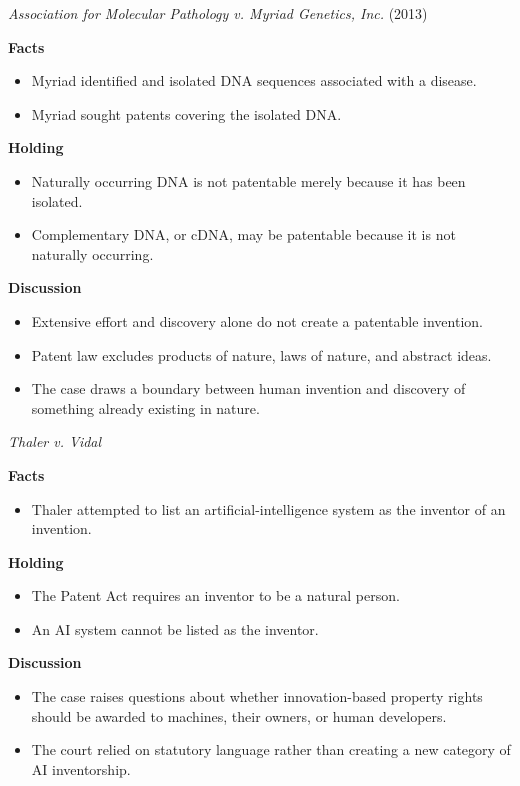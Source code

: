 \documentclass[11pt]{tex/lawoutline}
\begin{document}
\casebox
{\textit{Association for Molecular Pathology v. Myriad Genetics, Inc.} (2013)}
{}
{
\textbf{Facts}
\begin{itemize}
    \item Myriad identified and isolated DNA sequences associated with a disease.
    \item Myriad sought patents covering the isolated DNA.
\end{itemize}

\textbf{Holding}
\begin{itemize}
    \item Naturally occurring DNA is not patentable merely because it has been isolated.
    \item Complementary DNA, or cDNA, may be patentable because it is not naturally occurring.
\end{itemize}

\textbf{Discussion}
\begin{itemize}
    \item Extensive effort and discovery alone do not create a patentable invention.
    \item Patent law excludes products of nature, laws of nature, and abstract ideas.
    \item The case draws a boundary between human invention and discovery of something already existing in nature.
\end{itemize}
}

\casebox
{\textit{Thaler v. Vidal}}
{}
{
\textbf{Facts}
\begin{itemize}
    \item Thaler attempted to list an artificial-intelligence system as the inventor of an invention.
\end{itemize}

\textbf{Holding}
\begin{itemize}
    \item The Patent Act requires an inventor to be a natural person.
    \item An AI system cannot be listed as the inventor.
\end{itemize}

\textbf{Discussion}
\begin{itemize}
    \item The case raises questions about whether innovation-based property rights should be awarded to machines, their owners, or human developers.
    \item The court relied on statutory language rather than creating a new category of AI inventorship.
\end{itemize}
}
\end{document}
